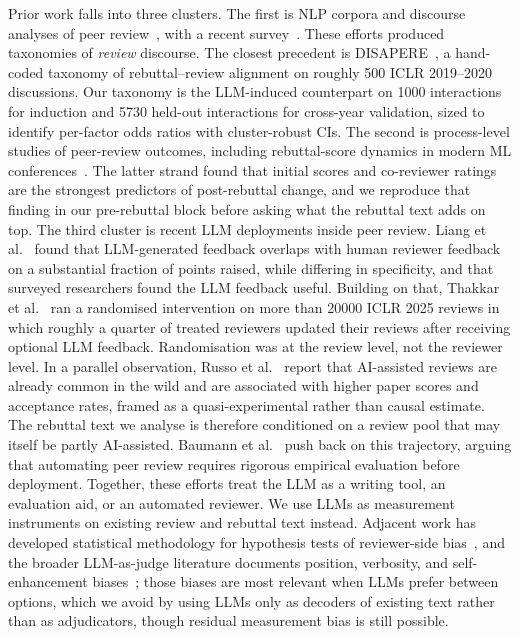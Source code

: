 \documentclass{article}
\begin{document}
Prior work falls into three clusters. The first is NLP corpora and discourse analyses of peer review~\cite{kang,hua,kennard}, with a recent survey~\cite{kuznetsov}. These efforts produced taxonomies of \emph{review} discourse. The closest precedent is DISAPERE~\cite{kennard}, a hand-coded taxonomy of rebuttal--review alignment on roughly 500 ICLR 2019--2020 discussions. Our taxonomy is the LLM-induced counterpart on \num{1000} interactions for induction and \num{5730} held-out interactions for cross-year validation, sized to identify per-factor odds ratios with cluster-robust CIs. The second is process-level studies of peer-review outcomes, including rebuttal-score dynamics in modern ML conferences~\cite{huang,jung,kargaran}. The latter strand found that initial scores and co-reviewer ratings are the strongest predictors of post-rebuttal change, and we reproduce that finding in our pre-rebuttal block before asking what the rebuttal text adds on top. The third cluster is recent LLM deployments inside peer review. Liang et al.~\cite{liang} found that LLM-generated feedback overlaps with human reviewer feedback on a substantial fraction of points raised, while differing in specificity, and that surveyed researchers found the LLM feedback useful. Building on that, Thakkar et al.~\cite{thakkar} ran a randomised intervention on more than \num{20000} ICLR 2025 reviews in which roughly a quarter of treated reviewers updated their reviews after receiving optional LLM feedback. Randomisation was at the review level, not the reviewer level. In a parallel observation, Russo et al.~\cite{russo} report that AI-assisted reviews are already common in the wild and are associated with higher paper scores and acceptance rates, framed as a quasi-experimental rather than causal estimate. The rebuttal text we analyse is therefore conditioned on a review pool that may itself be partly AI-assisted. Baumann et al.~\cite{baumann} push back on this trajectory, arguing that automating peer review requires rigorous empirical evaluation before deployment. Together, these efforts treat the LLM as a writing tool, an evaluation aid, or an automated reviewer. We use LLMs as measurement instruments on existing review and rebuttal text instead. Adjacent work has developed statistical methodology for hypothesis tests of reviewer-side bias~\cite{stelmakh}, and the broader LLM-as-judge literature documents position, verbosity, and self-enhancement biases~\cite{zheng}; those biases are most relevant when LLMs prefer between options, which we avoid by using LLMs only as decoders of existing text rather than as adjudicators, though residual measurement bias is still possible.
\end{document}

